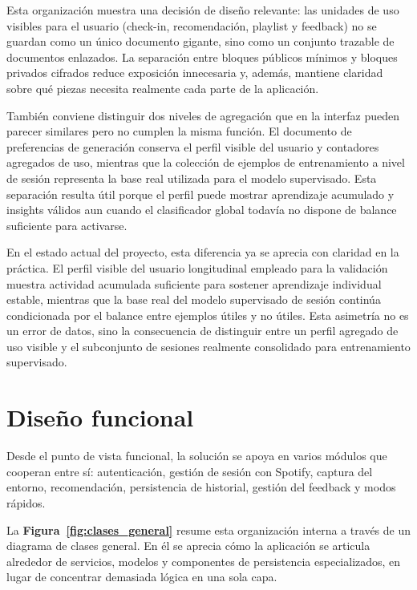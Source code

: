 Esta organización muestra una decisión de diseño relevante: las unidades de uso
visibles para el usuario (check-in, recomendación, playlist y feedback) no se
guardan como un único documento gigante, sino como un conjunto trazable de
documentos enlazados. La separación entre bloques públicos mínimos y bloques
privados cifrados reduce exposición innecesaria y, además, mantiene claridad
sobre qué piezas necesita realmente cada parte de la aplicación.

También conviene distinguir dos niveles de agregación que en la interfaz pueden
parecer similares pero no cumplen la misma función. El documento de
preferencias de generación conserva el perfil visible del usuario y contadores
agregados de uso, mientras que la colección de ejemplos de entrenamiento a
nivel de sesión representa la base real utilizada para el modelo supervisado.
Esta separación resulta útil porque el perfil puede mostrar aprendizaje
acumulado y insights válidos aun cuando el clasificador global todavía
no dispone de balance suficiente para activarse.

En el estado actual del proyecto, esta diferencia ya se aprecia con claridad en
la práctica. El perfil visible del usuario longitudinal empleado para la
validación muestra actividad acumulada suficiente para sostener aprendizaje
individual estable, mientras que la base real del modelo supervisado de sesión
continúa condicionada por el balance entre ejemplos útiles y no útiles. Esta
asimetría no es un error de datos, sino la consecuencia de distinguir entre un
perfil agregado de uso visible y el subconjunto de sesiones realmente
consolidado para entrenamiento supervisado.

\section{Diseño funcional}
\label{sec:diseno_funcional}

Desde el punto de vista funcional, la solución se apoya en varios módulos que
cooperan entre sí: autenticación, gestión de sesión con Spotify, captura del
entorno, recomendación, persistencia de historial, gestión del feedback y modos
rápidos.

La \textbf{Figura~\ref{fig:clases_general}} resume esta organización interna a
través de un diagrama de clases general. En él se aprecia cómo la aplicación se
articula alrededor de servicios, modelos y componentes de persistencia
especializados, en lugar de concentrar demasiada lógica en una sola capa.

